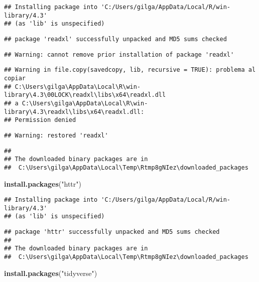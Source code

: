 \documentclass[
]{article}
\newenvironment{Shaded}{\begin{snugshade}}{\end{snugshade}}
\newcommand{\FunctionTok}[1]{\textcolor[rgb]{0.13,0.29,0.53}{\textbf{#1}}}
\newcommand{\NormalTok}[1]{#1}
\newcommand{\StringTok}[1]{\textcolor[rgb]{0.31,0.60,0.02}{#1}}
\begin{document}
\begin{verbatim}
## Installing package into 'C:/Users/gilga/AppData/Local/R/win-library/4.3'
## (as 'lib' is unspecified)
\end{verbatim}

\begin{verbatim}
## package 'readxl' successfully unpacked and MD5 sums checked
\end{verbatim}

\begin{verbatim}
## Warning: cannot remove prior installation of package 'readxl'
\end{verbatim}

\begin{verbatim}
## Warning in file.copy(savedcopy, lib, recursive = TRUE): problema al copiar
## C:\Users\gilga\AppData\Local\R\win-library\4.3\00LOCK\readxl\libs\x64\readxl.dll
## a C:\Users\gilga\AppData\Local\R\win-library\4.3\readxl\libs\x64\readxl.dll:
## Permission denied
\end{verbatim}

\begin{verbatim}
## Warning: restored 'readxl'
\end{verbatim}

\begin{verbatim}
## 
## The downloaded binary packages are in
##  C:\Users\gilga\AppData\Local\Temp\Rtmp8gNIez\downloaded_packages
\end{verbatim}

\begin{Shaded}
\begin{Highlighting}[]
\FunctionTok{install.packages}\NormalTok{(}\StringTok{"httr"}\NormalTok{)}
\end{Highlighting}
\end{Shaded}

\begin{verbatim}
## Installing package into 'C:/Users/gilga/AppData/Local/R/win-library/4.3'
## (as 'lib' is unspecified)
\end{verbatim}

\begin{verbatim}
## package 'httr' successfully unpacked and MD5 sums checked
## 
## The downloaded binary packages are in
##  C:\Users\gilga\AppData\Local\Temp\Rtmp8gNIez\downloaded_packages
\end{verbatim}

\begin{Shaded}
\begin{Highlighting}[]
\FunctionTok{install.packages}\NormalTok{(}\StringTok{"tidyverse"}\NormalTok{)}
\end{Highlighting}
\end{Shaded}
\end{document}
